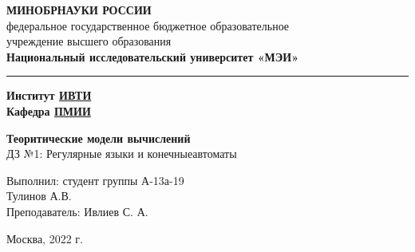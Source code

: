 \documentclass{article}
\begin{document}
\thispagestyle{empty}
\begin{center}
\large \textbf{МИНОБРНАУКИ РОССИИ}\\
\normalsize{федеральное государственное бюджетное образовательное\\
учреждение высшего образования}\\
\large \textbf{Национальный исследовательский университет «МЭИ»}\\
\noindent\rule{15cm}{0.4pt}
\end{center}
\begin{flushright}
\large \textbf {Институт \underline {ИВТИ}}\\
\large \textbf {Кафедра \underline {ПМИИ}}\\
\end{flushright}
\begin{center}
\large \textbf{Теоритические модели вычислений}\\
\large{ДЗ №1: Регулярные языки и конечныеавтоматы}\\
\end{center}
\hfill \break
\begin{flushright}
{Выполнил: студент группы А-13а-19 
\\Тулинов А.В.\\
Преподаватель: Ивлиев С. А.}\\
\end{flushright}
\hfill \break
\hfill \break
\hfill \break
\begin{center}
Москва, 2022 г.
\end{center}
\end{document}
